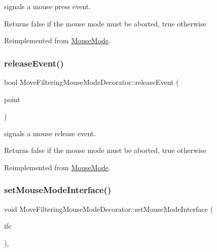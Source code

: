 signals a mouse press event. 

\begin{DoxyReturn}{Returns}
false if the mouse mode must be aborted, true otherwise 
\end{DoxyReturn}


Reimplemented from \mbox{\hyperlink{class_mouse_mode_ac726911a60e2cbd733d6d6a55d2ceba9}{Mouse\+Mode}}.

\mbox{\label{class_move_filtering_mouse_mode_decorator_a331745d728889576d415a0e6f20aa236}} 
\subsubsection{\texorpdfstring{releaseEvent()}{releaseEvent()}}
{\footnotesize\ttfamily bool Move\+Filtering\+Mouse\+Mode\+Decorator\+::release\+Event (\begin{DoxyParamCaption}\item[{const Q\+PointF \&}]{point }\end{DoxyParamCaption})\hspace{0.3cm}{\ttfamily [virtual]}}



signals a mouse release event. 

\begin{DoxyReturn}{Returns}
false if the mouse mode must be aborted, true otherwise 
\end{DoxyReturn}


Reimplemented from \mbox{\hyperlink{class_mouse_mode_a9515661d7c29ab234b7e70d0fe7e5db0}{Mouse\+Mode}}.

\mbox{\label{class_move_filtering_mouse_mode_decorator_ab275ef7f3f65b4f1c58c937e167c55d3}} 
\subsubsection{\texorpdfstring{setMouseModeInterface()}{setMouseModeInterface()}}
{\footnotesize\ttfamily void Move\+Filtering\+Mouse\+Mode\+Decorator\+::set\+Mouse\+Mode\+Interface (\begin{DoxyParamCaption}\item[{\mbox{\hyperlink{class_mouse_mode_interface}{Mouse\+Mode\+Interface}} $\ast$}]{ifc }\end{DoxyParamCaption})\hspace{0.3cm}{\ttfamily [inline]}, {\ttfamily [virtual]}}



